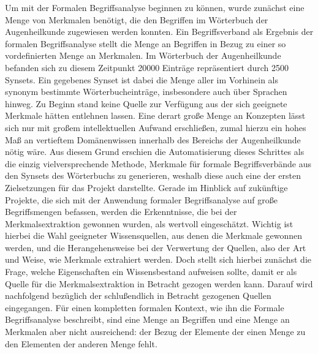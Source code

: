 \documentclass[pagesize,DIV=calc,12pt,draft]{scrreprt}
\begin{document}
Um mit der Formalen Begriffsanalyse beginnen zu können, wurde zunächst eine Menge von Merkmalen benötigt, die den Begriffen im Wörterbuch der Augenheilkunde zugewiesen werden konnten. 
Ein Begriffsverband als Ergebnis der formalen Begriffsanalyse stellt die Menge an Begriffen in Bezug zu einer so vordefinierten Menge an Merkmalen. 
Im Wörterbuch der Augenheilkunde befanden sich zu diesem Zeitpunkt 20000 Einträge repräsentiert durch 2500 Synsets. 
Ein gegebenes Synset ist dabei die Menge aller im Vorhinein als synonym bestimmte Wörterbucheinträge, insbesondere auch über Sprachen hinweg. 
Zu Beginn stand keine Quelle zur Verfügung aus der sich geeignete Merkmale hätten entlehnen lassen. 
Eine derart große Menge an Konzepten lässt sich nur mit großem intellektuellen Aufwand erschließen, zumal hierzu ein hohes Maß an vertieftem Domänenwissen innerhalb des Bereichs der Augenheilkunde nötig wäre. 
Aus diesem Grund erschien die Automatisierung dieses Schrittes als die einzig vielversprechende Methode, Merkmale für formale Begriffsverbände aus den Synsets des Wörterbuchs zu generieren, weshalb diese auch eine der ersten Zielsetzungen für das Projekt darstellte. 
Gerade im Hinblick auf zukünftige Projekte, die sich mit der Anwendung formaler Begriffsanalyse auf große Begriffsmengen befassen, werden die Erkenntnisse, die bei der Merkmalsextraktion gewonnen wurden, als wertvoll eingeschätzt. 
Wichtig ist hierbei die Wahl geeigneter Wissensquellen, aus denen die Merkmale gewonnen werden, und die Herangehensweise bei der Verwertung der Quellen, also der Art und Weise, wie Merkmale extrahiert werden. 
Doch stellt sich hierbei zunächst die Frage, welche Eigenschaften ein Wissensbestand aufweisen sollte, damit er als Quelle für die Merkmalsextraktion in Betracht gezogen werden kann. 
Darauf wird nachfolgend bezüglich der schlußendlich in Betracht gezogenen Quellen eingegangen. 
Für einen kompletten formalen Kontext, wie ihn die Formale Begriffsanalyse beschreibt, sind eine Menge an Begriffen und eine Menge an Merkmalen aber nicht ausreichend: der Bezug der Elemente der einen Menge zu den Elementen der anderen Menge fehlt. 
\end{document}
